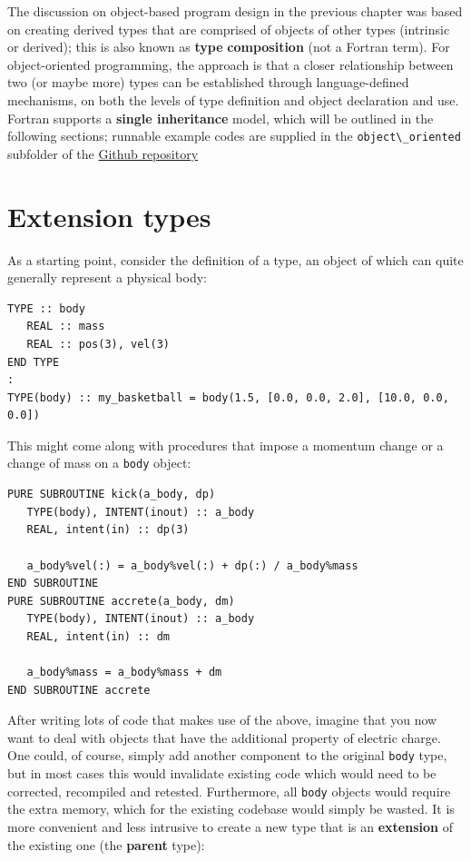 \documentclass[
  paper=a4,
  ,captions=tableheading
]{scrartcl}
\newcommand{\passthrough}[1]{#1}
\begin{document}
The discussion on object-based program design in the previous chapter
was based on creating derived types that are comprised of objects of
other types (intrinsic or derived); this is also known as \textbf{type}
\textbf{composition} (not a Fortran term). For object-oriented
programming, the approach is that a closer relationship between two (or
maybe more) types can be established through language-defined
mechanisms, on both the levels of type definition and object declaration
and use. Fortran supports a \textbf{single inheritance} model, which
will be outlined in the following sections; runnable example codes are
supplied in the \passthrough{\lstinline!object\_oriented!} subfolder of
the \href{https://github.com/reinh-bader/object_fortran}{Github
repository}

\section{Extension types}\label{extension-types}

As a starting point, consider the definition of a type, an object of
which can quite generally represent a physical body:

\begin{lstlisting}
TYPE :: body
   REAL :: mass
   REAL :: pos(3), vel(3)
END TYPE
:
TYPE(body) :: my_basketball = body(1.5, [0.0, 0.0, 2.0], [10.0, 0.0, 0.0])
\end{lstlisting}

This might come along with procedures that impose a momentum change or a
change of mass on a \passthrough{\lstinline!body!} object:

\begin{lstlisting}
PURE SUBROUTINE kick(a_body, dp)
   TYPE(body), INTENT(inout) :: a_body
   REAL, intent(in) :: dp(3)

   a_body%vel(:) = a_body%vel(:) + dp(:) / a_body%mass
END SUBROUTINE
PURE SUBROUTINE accrete(a_body, dm)
   TYPE(body), INTENT(inout) :: a_body
   REAL, intent(in) :: dm

   a_body%mass = a_body%mass + dm
END SUBROUTINE accrete
\end{lstlisting}

After writing lots of code that makes use of the above, imagine that you
now want to deal with objects that have the additional property of
electric charge. One could, of course, simply add another component to
the original \passthrough{\lstinline!body!} type, but in most cases this
would invalidate existing code which would need to be corrected,
recompiled and retested. Furthermore, all \passthrough{\lstinline!body!}
objects would require the extra memory, which for the existing codebase
would simply be wasted. It is more convenient and less intrusive to
create a new type that is an \textbf{extension} of the existing one (the
\textbf{parent} type):
\end{document}
